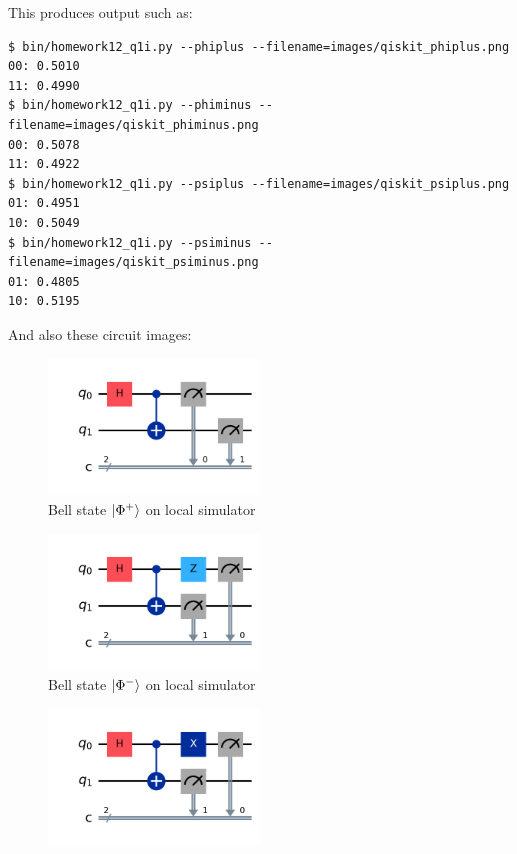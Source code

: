 \documentclass[12pt]{extarticle}
\begin{document}
\begin{enumerate}[(a)]
This produces output such as:
\begin{footnotesize}
\begin{lstlisting}
$ bin/homework12_q1i.py --phiplus --filename=images/qiskit_phiplus.png
00: 0.5010
11: 0.4990
$ bin/homework12_q1i.py --phiminus --filename=images/qiskit_phiminus.png
00: 0.5078
11: 0.4922
$ bin/homework12_q1i.py --psiplus --filename=images/qiskit_psiplus.png
01: 0.4951
10: 0.5049
$ bin/homework12_q1i.py --psiminus --filename=images/qiskit_psiminus.png
01: 0.4805
10: 0.5195
\end{lstlisting}
\end{footnotesize}

And also these circuit images:
\begin{figure}[H]
\centering
\includegraphics[width=0.50\textwidth]{images/qiskit_phiplus.png}
\caption{Bell state $\ket{\Phi^{+}}$ on local simulator}
\end{figure}
\begin{figure}[H]
\centering
\includegraphics[width=0.50\textwidth]{images/qiskit_phiminus.png}
\caption{Bell state $\ket{\Phi^{-}}$ on local simulator}
\end{figure}
\begin{figure}[H]
\centering
\includegraphics[width=0.50\textwidth]{images/qiskit_psiplus.png}

\end{figure}
\end{enumerate}
\end{document}
